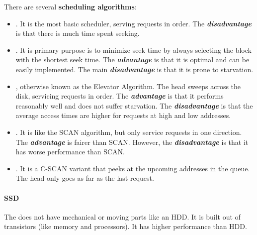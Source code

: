 \noindent
There are several \textbf{scheduling algorithms}:
\begin{itemize}
    \item {}. It is the most basic scheduler, serving requests in order. The \emph{\textbf{disadvantage}} is that there is much time spent seeking.

    \item {}. It is primary purpose is to minimize seek time by always selecting the block with the shortest seek time. The \textbf{\emph{advantage}} is that it is optimal and can be easily implemented. The main \emph{\textbf{disadvantage}} is that it is prone to starvation.

    \item {}, otherwise known as the Elevator Algorithm. The head sweeps across the disk, servicing requests in order. The \textbf{\emph{advantage}} is that it performs reasonably well and does not suffer starvation. The \emph{\textbf{disadvantage}} is that the average access times are higher for requests at high and low addresses.

    \item {}. It is like the SCAN algorithm, but only service requests in one direction. The \textbf{\emph{advantage}} is fairer than SCAN. However, the \emph{\textbf{disadvantage}} is that it has worse performance than SCAN.

    \item {}. It is a C-SCAN variant that peeks at the upcoming addresses in the queue. The head only goes as far as the last request.
\end{itemize}

\newpage

\paragraph{SSD}\label{paragraph: SSD}

The  does not have mechanical or moving parts like an HDD. It is built out of transistors (like memory and processors). It has higher performance than HDD.

